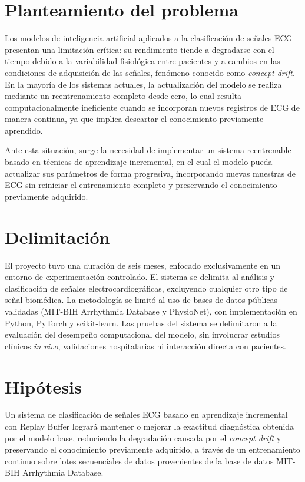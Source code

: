 \documentclass[11pt,spanish]{citedi}
\begin{document}
\section{Planteamiento del problema}

Los modelos de inteligencia artificial aplicados a la clasificación de señales ECG presentan una limitación crítica: su rendimiento tiende a degradarse con el tiempo debido a la variabilidad fisiológica entre pacientes y a cambios en las condiciones de adquisición de las señales, fenómeno conocido como \textit{concept drift}. En la mayoría de los sistemas actuales, la actualización del modelo se realiza mediante un reentrenamiento completo desde cero, lo cual resulta computacionalmente ineficiente cuando se incorporan nuevos registros de ECG de manera continua, ya que implica descartar el conocimiento previamente aprendido.

Ante esta situación, surge la necesidad de implementar un sistema reentrenable basado en técnicas de aprendizaje incremental, en el cual el modelo pueda actualizar sus parámetros de forma progresiva, incorporando nuevas muestras de ECG sin reiniciar el entrenamiento completo y preservando el conocimiento previamente adquirido.

\section{Delimitación}

El proyecto tuvo una duración de seis meses, enfocado exclusivamente en un entorno de experimentación controlado. El sistema se delimita al análisis y clasificación de señales electrocardiográficas, excluyendo cualquier otro tipo de señal biomédica. La metodología se limitó al uso de bases de datos públicas validadas (MIT-BIH Arrhythmia Database y PhysioNet), con implementación en Python, PyTorch y scikit-learn. Las pruebas del sistema se delimitaron a la evaluación del desempeño computacional del modelo, sin involucrar estudios clínicos \textit{in vivo}, validaciones hospitalarias ni interacción directa con pacientes.

\section{Hipótesis}

Un sistema de clasificación de señales ECG basado en aprendizaje incremental con Replay Buffer logrará mantener o mejorar la exactitud diagnóstica obtenida por el modelo base, reduciendo la degradación causada por el \textit{concept drift} y preservando el conocimiento previamente adquirido, a través de un entrenamiento continuo sobre lotes secuenciales de datos provenientes de la base de datos MIT-BIH Arrhythmia Database.
\end{document}
